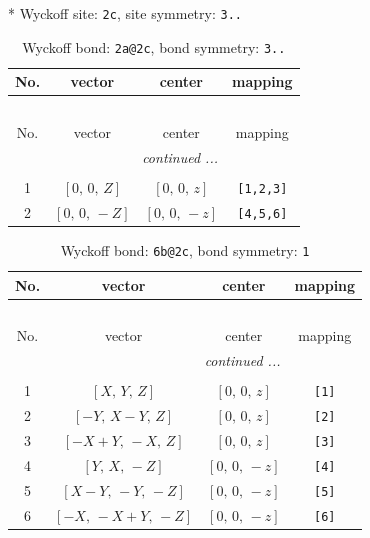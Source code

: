 \documentclass[fleqn,8pt]{jsarticle}
\begin{document}
* Wyckoff site: {\tt 2c}, site symmetry: {\tt 3..}
\renewcommand{\arraystretch}{1.2}
\begin{longtable}{cccc}
\caption{Wyckoff bond: {\tt 2a@2c}, bond symmetry: {\tt 3..}}
 \\
 \hline \hline
No. & vector & center & mapping \\ \hline \endfirsthead

\multicolumn{3}{l}{\tablename\ \thetable{}} \\
 \hline \hline
No. & vector & center & mapping \\ \hline \endhead

 \hline \hline
\multicolumn{3}{r}{\footnotesize\it continued ...} \\ \endfoot

 \hline \hline
\multicolumn{3}{r}{} \\ \endlastfoot

1 & $\left[ 0,\, 0,\, Z \right]$ & $\left[ 0,\, 0,\, z \right]$ & {\tt [1,2,3]} \\ \hline
2 & $\left[ 0,\, 0,\, - Z \right]$ & $\left[ 0,\, 0,\, - z \right]$ & {\tt [4,5,6]} \\
\end{longtable}
\renewcommand{\arraystretch}{1.2}
\begin{longtable}{cccc}
\caption{Wyckoff bond: {\tt 6b@2c}, bond symmetry: {\tt 1}}
 \\
 \hline \hline
No. & vector & center & mapping \\ \hline \endfirsthead

\multicolumn{3}{l}{\tablename\ \thetable{}} \\
 \hline \hline
No. & vector & center & mapping \\ \hline \endhead

 \hline \hline
\multicolumn{3}{r}{\footnotesize\it continued ...} \\ \endfoot

 \hline \hline
\multicolumn{3}{r}{} \\ \endlastfoot

1 & $\left[ X,\, Y,\, Z \right]$ & $\left[ 0,\, 0,\, z \right]$ & {\tt [1]} \\ \hline
2 & $\left[ - Y,\, X - Y,\, Z \right]$ & $\left[ 0,\, 0,\, z \right]$ & {\tt [2]} \\ \hline
3 & $\left[ - X + Y,\, - X,\, Z \right]$ & $\left[ 0,\, 0,\, z \right]$ & {\tt [3]} \\ \hline
4 & $\left[ Y,\, X,\, - Z \right]$ & $\left[ 0,\, 0,\, - z \right]$ & {\tt [4]} \\ \hline
5 & $\left[ X - Y,\, - Y,\, - Z \right]$ & $\left[ 0,\, 0,\, - z \right]$ & {\tt [5]} \\ \hline
6 & $\left[ - X,\, - X + Y,\, - Z \right]$ & $\left[ 0,\, 0,\, - z \right]$ & {\tt [6]} \\
\end{longtable}
\end{document}
